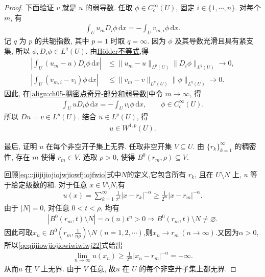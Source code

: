 \documentclass[../../main.tex]{subfiles}
\begin{document}
\begin{proof}
下面验证 $v$ 就是 $u$ 的弱导数. 任取 $\phi\in C_c^\infty(U)$, 固定 $i\in\{1,\cdots,n\}$. 对每个 $m$, 有
\begin{align}
\int_Uu_mD_i\phi\,\mathrm{d}x
=-\int_Uv_{m,i}\phi\,\mathrm{d}x.
\label{align:ch05-稠密点奇异-部分和弱导数}
\end{align}
记 $q$ 为 $p$ 的共轭指数, 其中 $p=1$ 时取 $q=\infty$.
因为 $\phi$ 及其导数光滑且具有紧支集, 所以
$\phi,D_i\phi\in L^q(U)$. 由\hyperref[Real Analysis-theorem:实变函数--Hölder不等式]{Hölder不等式},得
\begin{align*}
\left|
\int_U(u_m-u)D_i\phi\,\mathrm{d}x
\right|
&\leqslant
\|u_m-u\|_{L^p(U)}\|D_i\phi\|_{L^q(U)}
\longrightarrow0,\\
\left|
\int_U(v_{m,i}-v_i)\phi\,\mathrm{d}x
\right|
&\leqslant
\|v_m-v\|_{L^p(U)}
\|\phi\|_{L^q(U)}
\longrightarrow0.
\end{align*}
因此, 在\eqref{align:ch05-稠密点奇异-部分和弱导数}中令 $m\to\infty$, 得
\begin{align*}
\int_UuD_i\phi\,\mathrm{d}x
=-\int_Uv_i\phi\,\mathrm{d}x,
\qquad \phi\in C_c^\infty(U).
\end{align*}
所以 $Du=v\in L^p(U)$. 结合 $u\in L^p(U)$, 得
\begin{align*}
u\in W^{1,p}(U).
\end{align*}

最后, 证明 $u$ 在每个非空开子集上无界.
任取非空开集 $V\subseteq U$. 由 $\{r_k\}_{k=1}^{\infty}$ 的稠密性, 存在 $m$ 使得 $r_m\in V$.
选取 $\rho>0$, 使得 $B^{0}(r_m,\rho)\subseteq V$.

回顾\eqref{eq:::jiijijiojiojwjiowfjiojfwio}式中$N$的定义,它包含所有 $r_k$, 且在 $U\setminus N$ 上, $u$ 等于给定级数的和.
对于任意 $x\in V\setminus N$,有
\begin{align}\label{qeqjijiowjiojiowiwiwiwj22}
u(x)
=\sum\limits_{k=1}^{\infty}\frac{1}{2^k}|x-r_k|^{-\alpha}
\geqslant\frac{1}{2^m}|x-r_m|^{-\alpha}.
\end{align}
由于 $|N|=0$, 对任意 $0<t<\rho$, 均有
\begin{align*}
|B^{0}(r_m,t)\setminus N|
=\alpha(n)t^n>0\Longrightarrow B^{0}(r_m,t)\setminus N\neq \varnothing.
\end{align*}
因此可取$x_n\in B^0\left( r_m,\frac{1}{n\rho} \right) \setminus N\,(n=1,2,\cdots)$,则$x_n\to r_m\,(n\to \infty)$.又因为$\alpha>0$,所以\eqref{qeqjijiowjiojiowiwiwiwj22}式给出
\begin{align*}
\underset{n\rightarrow \infty}{\lim}u\left( x_n \right) \geqslant \frac{1}{2^m}\left| x_n-r_m \right|^{-\alpha}=+\infty .
\end{align*}
从而$u$ 在 $V$ 上无界. 由于 $V$ 任意, 故$u$ 在 $U$ 的每个非空开子集上都无界.
\end{proof}
\end{document}
